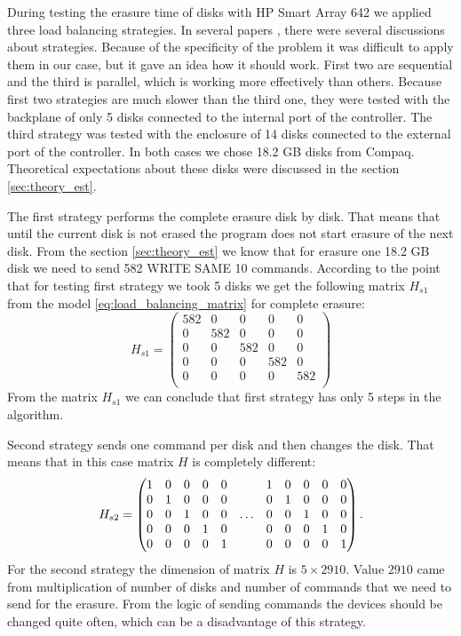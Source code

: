 During testing the erasure time of disks with HP Smart Array 642 we applied three load balancing strategies. In several papers \cite{load_bal_policy}, \cite{diff_policies} there were several discussions about strategies. Because of the specificity of the problem it was difficult to apply them in our case, but it gave an idea how it should work. First two are sequential and the third is parallel, which is working more effectively than others. Because first two strategies are much slower than the third one, they were tested with the backplane of only 5 disks connected to the internal port of the controller. The third strategy was tested with the enclosure of 14 disks connected to the external port of the controller. In both cases we chose 18.2 GB disks from Compaq. Theoretical expectations about these disks were discussed in the section \ref{sec:theory_est}.

The first strategy performs the complete erasure disk by disk. That means that until the current disk is not erased the program does not start erasure of the next disk. From the section \ref{sec:theory_est} we know that for erasure one 18.2 GB disk we need to send 582 WRITE SAME 10 commands. According to the point that for testing first strategy we took 5 disks we get the following matrix $H_{s1}$ from the model \ref{eq:load_balancing_matrix} for complete erasure:
\begin{equation}
	H_{s1} =
	\begin{pmatrix}
		582 & 0 & 0 & 0 & 0\\
		0 & 582 & 0 & 0 & 0\\
		0 & 0 & 582 & 0 & 0\\
		0 & 0 & 0 & 582 & 0 \\
		0 & 0 & 0 & 0 & 582 \\
	\end{pmatrix}
\end{equation}
From the matrix $H_{s1}$ we can conclude that first strategy has only 5 steps in the algorithm.


Second strategy sends one command per disk and then changes the disk. That means that in this case
matrix $H$ is completely different:
\begin{equation}
\setcounter{MaxMatrixCols}{13}
	H_{s2} =
	\begin{pmatrix}
		1 & 0 & 0 & 0 & 0 &&  		1 & 0 & 0 & 0 & 0 \\
		0 & 1 & 0 & 0 & 0 &&  		0 & 1 & 0 & 0 & 0 \\
		0 & 0 & 1 & 0 & 0 &\ldots&   0 & 0 & 1 & 0 & 0 \\
		0 & 0 & 0 & 1 & 0 &&  		0 & 0 & 0 & 1 & 0 \\
		0 & 0 & 0 & 0 & 1 &&  		0 & 0 & 0 & 0 & 1 \\
	\end{pmatrix}.
\end{equation}
For the second strategy the dimension of matrix $H$ is $5\times2910$. Value $2910$ came from multiplication of number of disks and number of commands that we need to send for the erasure. From the logic of sending commands the devices should be changed quite often, which can be a disadvantage of this strategy. 


